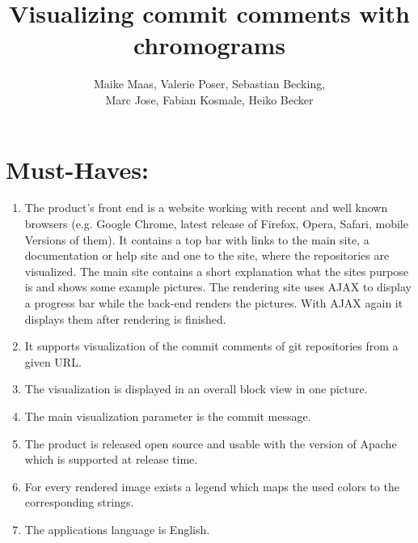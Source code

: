 \documentclass[12pt]{scrartcl}
\author{Maike Maas, Valerie Poser, Sebastian Becking,\\
Marc Jose, Fabian Kosmale, Heiko Becker}
\title{Visualizing commit comments with chromograms}
\begin{document}
\maketitle
\section{Must-Haves:}
\begin{enumerate}
\item The product's front end is a website working with recent and well known browsers (e.g. Google Chrome, latest release of Firefox, Opera, Safari, mobile Versions of them). It contains a top bar with links to the main site, a documentation or help site and one to the site, where the repositories are visualized. The main site contains a short explanation what the sites purpose is and shows some example pictures. The rendering site uses AJAX to display a progress bar while the back-end renders the pictures. With AJAX again it displays them after rendering is finished.
\item It supports visualization of the commit comments of git repositories from a given URL. 
\item The visualization is displayed in an overall block view in one picture.
\item The main visualization parameter is the commit message.
\item The product is released open source and usable with the version of Apache which is supported at release time.
\item For every rendered image exists a legend which maps the used colors to the corresponding strings.
\item The applications language is English.
\end{enumerate}
\end{document}
